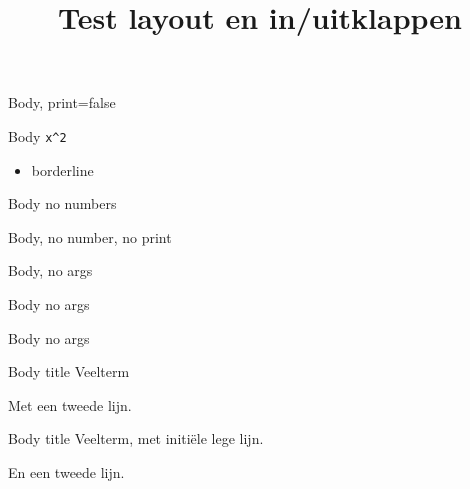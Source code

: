 \documentclass{ximera}
\begin{document}
\title{Test layout en in/uitklappen}
\begin{abstract}
\end{abstract}
\maketitle



\begin{BoxI}[Veelterm,print=false]
  Body, print=false
\end{BoxI}
\begin{BoxI}[Veelterm]
Body  \verb|x^2|
\begin{itemize}
\item borderline
\end{itemize}
\end{BoxI}

\begin{BoxI}[title={Veelterm, not numbered},nonumbered]
Body no numbers
\end{BoxI}

\begin{BoxI}[title={Veelterm, not numbered not printed},noprint,nonumbered]
Body, no number, no print
\end{BoxI}

\begin{BoxI}
Body, no args
\end{BoxI}


\begin{definition}
Body no args
\end{definition}

\begin{proposition}
Body no args
\end{proposition}


\begin{definition}[Veelterm]
Body title Veelterm

Met een tweede lijn.
\end{definition}

\begin{definition}[title={Veelterm, met een lege lijn (en een komma en haakjes in de title)}]

 Body title Veelterm, met initiële lege lijn.

 En een tweede lijn.
\end{definition}
\end{document}
